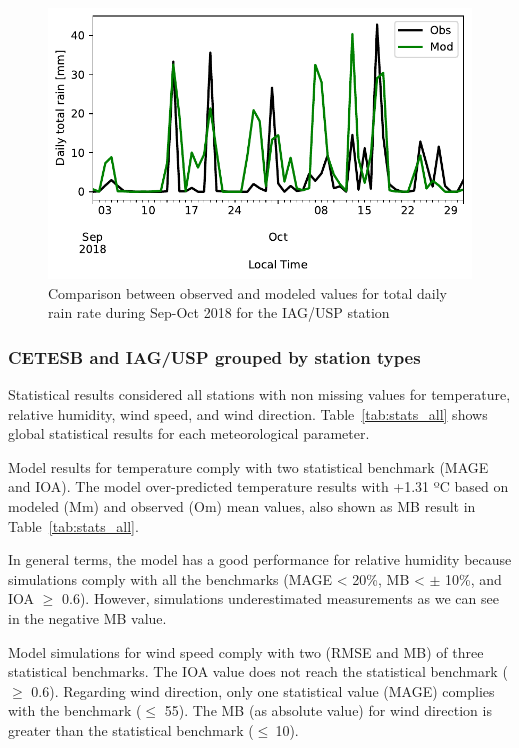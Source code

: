 \begin{figure}[!hbt]
	\centering
  \includegraphics[width=.8\textwidth]{fig/iag_daily_rain}
  \caption{Comparison between observed and modeled values for total daily rain rate during Sep-Oct 2018 for the IAG/USP station}
  \label{fig:iag_daily_rain}
\end{figure}




\subsubsection{CETESB and IAG/USP grouped by station types}
Statistical results considered all stations with non missing values for temperature, relative humidity, wind speed, and wind direction.
Table~\ref{tab:stats_all} shows global statistical results for each meteorological parameter.



Model results for temperature comply with two statistical benchmark (MAGE and IOA).
The model over-predicted temperature results with +1.31 ºC based on modeled (Mm) and observed (Om) mean values, also shown as MB result in Table~\ref{tab:stats_all}.

In general terms, the model has a good performance for relative humidity because simulations comply with all the benchmarks (MAGE < 20\%, MB < $\pm$ 10\%, and IOA $\geq$ 0.6).
However, simulations underestimated measurements as we can see in the negative MB value.

Model simulations for wind speed comply with two (RMSE and MB) of three statistical benchmarks.
The IOA value does not reach the statistical benchmark ($\geq$ 0.6).
Regarding wind direction, only one statistical value (MAGE) complies with the benchmark ($\leq$ 55).
The MB (as absolute value) for wind direction is greater than the statistical benchmark ($\leq~$10).

